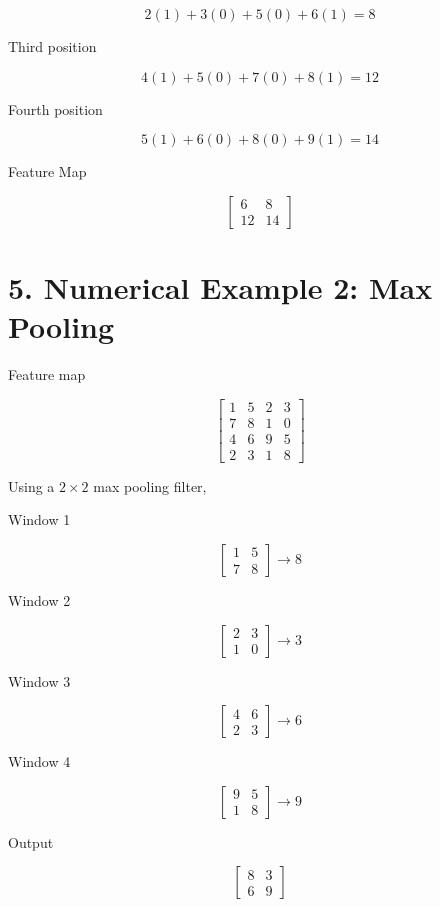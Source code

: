 \documentclass[11pt]{article}
\begin{document}
\[
2(1)+3(0)+5(0)+6(1)=8
\]

Third position

\[
4(1)+5(0)+7(0)+8(1)=12
\]

Fourth position

\[
5(1)+6(0)+8(0)+9(1)=14
\]

Feature Map

\[
\begin{bmatrix}
6&8\\
12&14
\end{bmatrix}
\]

\section*{5. Numerical Example 2: Max Pooling}

Feature map

\[
\begin{bmatrix}
1&5&2&3\\
7&8&1&0\\
4&6&9&5\\
2&3&1&8
\end{bmatrix}
\]

Using a $2\times2$ max pooling filter,

Window 1

\[
\begin{bmatrix}
1&5\\
7&8
\end{bmatrix}
\rightarrow 8
\]

Window 2

\[
\begin{bmatrix}
2&3\\
1&0
\end{bmatrix}
\rightarrow3
\]

Window 3

\[
\begin{bmatrix}
4&6\\
2&3
\end{bmatrix}
\rightarrow6
\]

Window 4

\[
\begin{bmatrix}
9&5\\
1&8
\end{bmatrix}
\rightarrow9
\]

Output

\[
\begin{bmatrix}
8&3\\
6&9
\end{bmatrix}
\]
\end{document}
